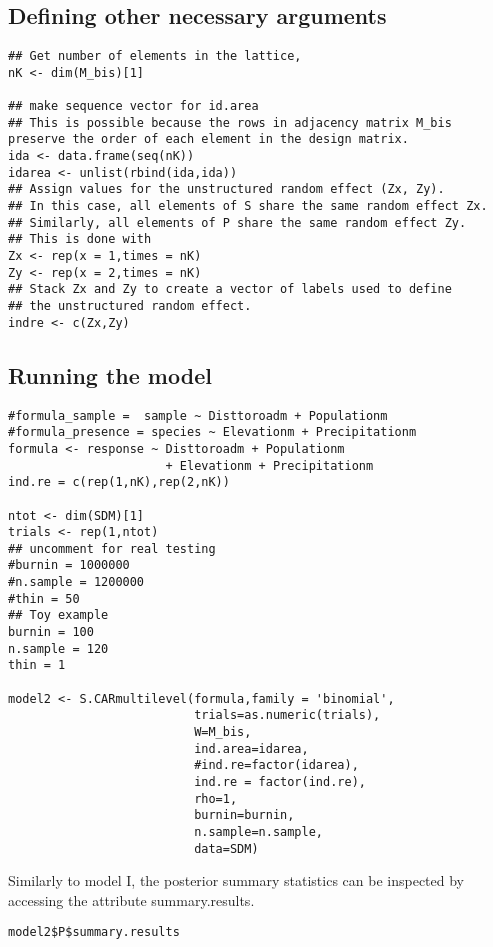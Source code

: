 \documentclass[11pt]{article}
\begin{document}
\subsection{Defining other necessary arguments}
\label{sec:org21036ac}
\begin{verbatim}
## Get number of elements in the lattice,
nK <- dim(M_bis)[1]

## make sequence vector for id.area
## This is possible because the rows in adjacency matrix M_bis preserve the order of each element in the design matrix.
ida <- data.frame(seq(nK))
idarea <- unlist(rbind(ida,ida))
## Assign values for the unstructured random effect (Zx, Zy).
## In this case, all elements of S share the same random effect Zx.
## Similarly, all elements of P share the same random effect Zy.
## This is done with
Zx <- rep(x = 1,times = nK)
Zy <- rep(x = 2,times = nK)
## Stack Zx and Zy to create a vector of labels used to define
## the unstructured random effect.
indre <- c(Zx,Zy)
\end{verbatim}

\subsection{Running the model}
\label{sec:org541f6ae}
\begin{verbatim}
#formula_sample =  sample ~ Disttoroadm + Populationm
#formula_presence = species ~ Elevationm + Precipitationm
formula <- response ~ Disttoroadm + Populationm
                      + Elevationm + Precipitationm
ind.re = c(rep(1,nK),rep(2,nK))

ntot <- dim(SDM)[1]
trials <- rep(1,ntot)
## uncomment for real testing
#burnin = 1000000
#n.sample = 1200000
#thin = 50
## Toy example
burnin = 100
n.sample = 120
thin = 1

model2 <- S.CARmultilevel(formula,family = 'binomial',
                          trials=as.numeric(trials),
                          W=M_bis,
                          ind.area=idarea,
                          #ind.re=factor(idarea),
                          ind.re = factor(ind.re),
                          rho=1,
                          burnin=burnin,
                          n.sample=n.sample,
                          data=SDM)
\end{verbatim}

Similarly to model I, the posterior summary statistics can be inspected by accessing the attribute summary.results.

\begin{verbatim}
model2$P$summary.results
\end{verbatim}
\end{document}
